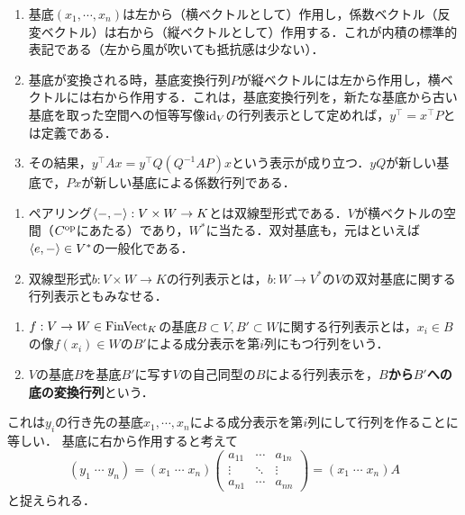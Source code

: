 \documentclass[uplatex,dvipdfmx]{jsreport}
\begin{document}
\begin{tcolorbox}[colframe=ForestGreen, colback=ForestGreen!10!white,breakable,colbacktitle=ForestGreen!40!white,coltitle=black,fonttitle=\bfseries\sffamily,
title=]
    \begin{enumerate}
        \item 基底$(x_1,\cdots,x_n)$は左から（横ベクトルとして）作用し，係数ベクトル（反変ベクトル）は右から（縦ベクトルとして）作用する．これが内積の標準的表記である（左から風が吹いても抵抗感は少ない）．
        \item 基底が変換される時，基底変換行列$P$が縦ベクトルには左から作用し，横ベクトルには右から作用する．これは，基底変換行列を，新たな基底から古い基底を取った空間への恒等写像$\mathrm{id}_V$の行列表示として定めれば，$y^\top=x^\top P$とは定義である．
        \item その結果，$y^\top Ax=y^\top Q(Q^{-1}AP)x$という表示が成り立つ．$yQ$が新しい基底で，$Px$が新しい基底による係数行列である．
    \end{enumerate}

    \begin{enumerate}
        \item ペアリング$\langle-,-\rangle:V\times W\to K$とは双線型形式である．$V$が横ベクトルの空間（$C^{\mathrm{op}}$にあたる）であり，$W^*$に当たる．双対基底も，元はといえば$\langle e,-\rangle\in V^*$の一般化である．
        \item 双線型形式$b:V\times W\to K$の行列表示とは，$b:W\to V^*$の$V$の双対基底に関する行列表示ともみなせる．
    \end{enumerate}
\end{tcolorbox}

\begin{definition}\mbox{}
    \begin{enumerate}
        \item $f:V\to W\in\mathrm{FinVect}_K$の基底$B\subset V,B'\subset W$に関する行列表示とは，$x_i\in B$の像$f(x_i)\in W$の$B'$による成分表示を第$i$列にもつ行列をいう．
        \item $V$の基底$B$を基底$B'$に写す$V$の自己同型の$B$による行列表示を，\textbf{$B$から$B'$への底の変換行列}という．
    \end{enumerate}
\end{definition}
\begin{remarks}
    これは$y_i$の行き先の基底$x_1,\cdots,x_n$による成分表示を第$i$列にして行列を作ることに等しい．
    基底に右から作用すると考えて
    \[(y_1\;\cdots\;y_n) = (x_1\;\cdots\;x_n)\begin{pmatrix}a_{11}&\cdots&a_{1n}\\\vdots&\ddots&\vdots\\a_{n1}&\cdots&a_{nn}\end{pmatrix}=(x_1\;\cdots\;x_n)A\]
    と捉えられる．
\end{remarks}
\end{document}
